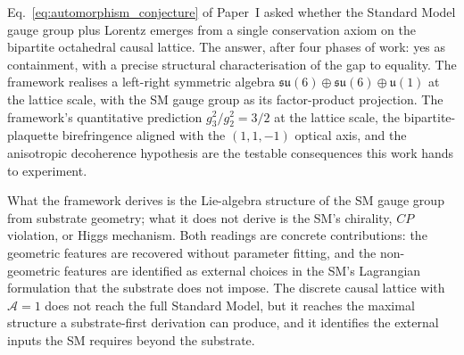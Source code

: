 Eq.~\eqref{eq:automorphism_conjecture} of Paper~I asked whether the Standard Model gauge group
plus Lorentz emerges from a single conservation axiom on the
bipartite octahedral causal lattice.  The answer, after four
phases of work: yes as containment, with a precise structural
characterisation of the gap to equality.  The framework realises
a left-right symmetric algebra $\mathfrak{su}(6) \oplus
\mathfrak{su}(6) \oplus \mathfrak{u}(1)$ at the lattice scale,
with the SM gauge group as its factor-product projection.  The
framework's quantitative prediction $g_3^2/g_2^2 = 3/2$ at the
lattice scale, the bipartite-plaquette birefringence aligned with
the $(1, 1, -1)$ optical axis, and the anisotropic decoherence
hypothesis are the testable consequences this work hands to
experiment.

What the framework derives is the Lie-algebra structure of the SM
gauge group from substrate geometry; what it does not derive is
the SM's chirality, $CP$ violation, or Higgs mechanism.  Both
readings are concrete contributions: the geometric features are
recovered without parameter fitting, and the non-geometric
features are identified as external choices in the SM's
Lagrangian formulation that the substrate does not impose.  The
discrete causal lattice with $\mathcal{A}=1$ does not reach the
full Standard Model, but it reaches the maximal structure a
substrate-first derivation can produce, and it identifies the
external inputs the SM requires beyond the substrate.
